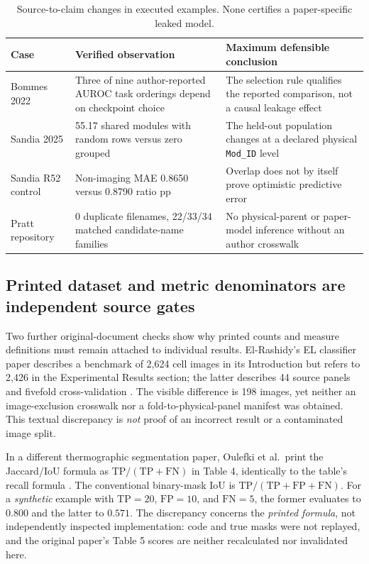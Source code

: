 \documentclass[10pt,a4paper]{article}
\begin{document}
\begin{table}[ht]\centering\small
\caption{Source-to-claim changes in executed examples. None certifies a paper-specific leaked model.}
\begin{tabularx}{\linewidth}{@{}p{2.0cm}X X@{}}\toprule
Case & Verified observation & Maximum defensible conclusion \\ \midrule
Bommes 2022 & Three of nine author-reported AUROC task orderings depend on checkpoint choice & The selection rule qualifies the reported comparison, not a causal leakage effect \\
Sandia 2025 & 55.17 shared modules with random rows versus zero grouped & The held-out population changes at a declared physical \texttt{Mod\_ID} level \\
Sandia R52 control & Non-imaging MAE 0.8650 versus 0.8790 ratio pp & Overlap does not by itself prove optimistic predictive error \\
Pratt repository & 0 duplicate filenames, 22/33/34 matched candidate-name families & No physical-parent or paper-model inference without an author crosswalk \\
\bottomrule\end{tabularx}
\end{table}

\subsection{Printed dataset and metric denominators are independent source gates}
Two further original-document checks show why printed counts and measure definitions must remain attached to individual results. El-Rashidy's EL classifier paper describes a benchmark of 2,624 cell images in its Introduction but refers to 2,426 in the Experimental Results section; the latter describes 44 source panels and fivefold cross-validation \cite{elrashidy2022}. The visible difference is 198 images, yet neither an image-exclusion crosswalk nor a fold-to-physical-panel manifest was obtained. This textual discrepancy is \emph{not} proof of an incorrect result or a contaminated image split.

In a different thermographic segmentation paper, Oulefki et al.\ print the Jaccard/IoU formula as $\mathrm{TP}/(\mathrm{TP}+\mathrm{FN})$ in Table 4, identically to the table's recall formula \cite{oulefki2024}. The conventional binary-mask IoU is $\mathrm{TP}/(\mathrm{TP}+\mathrm{FP}+\mathrm{FN})$. For a \emph{synthetic} example with $\mathrm{TP}=20$, $\mathrm{FP}=10$, and $\mathrm{FN}=5$, the former evaluates to $0.800$ and the latter to $0.571$. The discrepancy concerns the \emph{printed formula}, not independently inspected implementation: code and true masks were not replayed, and the original paper's Table 5 scores are neither recalculated nor invalidated here.
\end{document}
